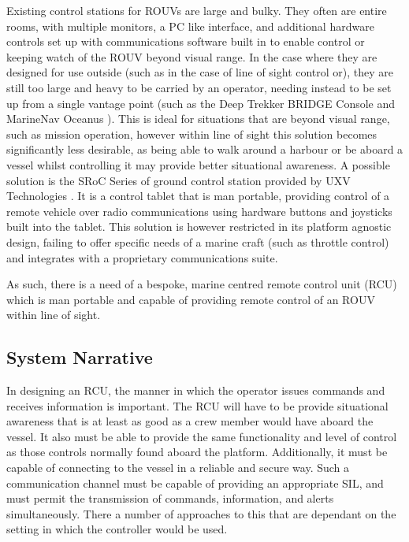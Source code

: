 \documentclass[../main.tex]{subfiles}
\begin{document}
Existing control stations for ROUVs are large and bulky.
They often are entire rooms, with multiple monitors, a PC like interface, and additional hardware controls set up with communications software built in to enable control or keeping watch of the ROUV beyond visual range.
In the case where they are designed for use outside (such as in the case of line of sight control or), they are still too large and heavy to be carried by an operator, needing instead to be set up from a single vantage point (such as the Deep Trekker BRIDGE Console \cite{DeepTrekker2025} and MarineNav Oceanus \cite{MARINENAV2026}).
This is ideal for situations that are beyond visual range, such as mission operation, however within line of sight this solution becomes significantly less desirable, as being able to walk around a harbour or be aboard a vessel whilst controlling it may provide better situational awareness.
A possible solution is the SRoC Series of ground control station provided by UXV Technologies \cite{UXVTechnologies}.
It is a control tablet that is man portable, providing control of a remote vehicle over radio communications using hardware buttons and joysticks built into the tablet.
This solution is however restricted in its platform agnostic design, failing to offer specific needs of a marine craft (such as throttle control) and integrates with a proprietary communications suite.

As such, there is a need of a bespoke, marine centred remote control unit (RCU) which is man portable and capable of providing remote control of an ROUV within line of sight.

\subsection{System Narrative}\label{1.3}

In designing an RCU, the manner in which the operator issues commands and receives information is important.
The RCU will have to be provide situational awareness that is at least as good as a crew member would have aboard the vessel.
It also must be able to provide the same functionality and level of control as those controls normally found aboard the platform.
Additionally, it must be capable of connecting to the vessel in a reliable and secure way.
Such a communication channel must be capable of providing an appropriate SIL, and must permit the transmission of commands, information, and alerts simultaneously.
There a number of approaches to this that are dependant on the setting in which the controller would be used.
\end{document}
